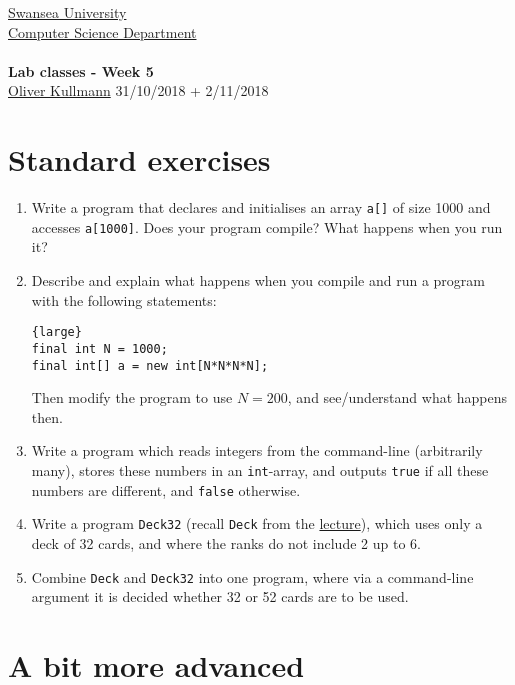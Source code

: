 \documentclass[11pt]{article}
\newcommand{\Java}{\lstset{language=Java,keywordstyle=\bfseries,breaklines,breakindent=30pt}}
\begin{document}
\begin{center}
  \href{http://www.swan.ac.uk/}{Swansea University}\\
  \href{http://www.swan.ac.uk/compsci/}{Computer Science Department}\\[1ex]
  \href{\chp}{\module}\\[1ex]
  \textbf{Lab classes - Week 5}\\
  \href{http://cs.swan.ac.uk/~csoliver}{Oliver Kullmann} 31/10/2018 + 2/11/2018
\end{center}

\section{Standard exercises}
\label{sec:stdex}

\Java

\begin{enumerate}
\item Write a program that declares and initialises an array \texttt{a[]} of size 1000 and accesses \texttt{a[1000]}. Does your program compile? What happens when you run it?
\item Describe and explain what happens when you compile and run a program with the following statements:
  \begin{lstlisting}{large}
final int N = 1000;
final int[] a = new int[N*N*N*N];
  \end{lstlisting}
  Then modify the program to use $N = 200$, and see/understand what happens then.
\item Write a program which reads integers from the command-line (arbitrarily many), stores these numbers in an \texttt{int}-array, and outputs \texttt{true} if all these numbers are different, and \texttt{false} otherwise.
\item Write a program \texttt{Deck32} (recall \texttt{Deck} from the \href{http://cs.swan.ac.uk/~csoliver/ProgrammingJava201415_MgQxuCUrrS/index.html#LecturesWeek05}{lecture}), which uses only a deck of 32 cards, and where the ranks do not include 2 up to 6.
\item Combine \texttt{Deck} and \texttt{Deck32} into one program, where via a command-line argument it is decided whether 32 or 52 cards are to be used.
\end{enumerate}


\section{A bit more advanced}
\label{sec:advanced}
\end{document}
